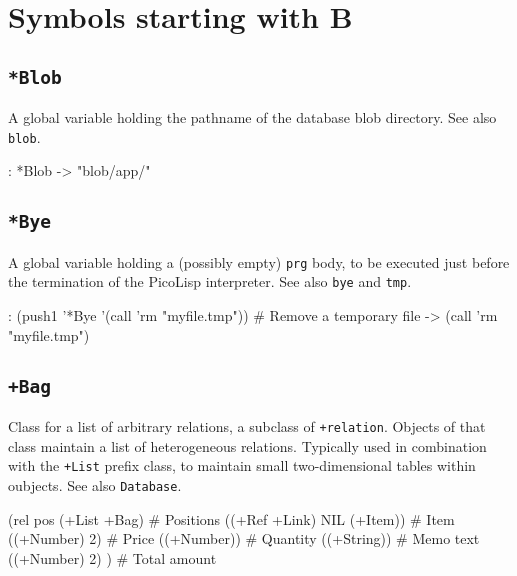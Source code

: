 %
%
%

\chapter{Symbols starting with B}
\label{cha:funct-ref-B-symbols-starting-B}
 
\section*{\texttt{*Blob}}
\label{sec:funct-ref-B-*blob}


A global variable holding the pathname of the database blob directory.
See also \texttt{blob}.


\begin{wideverbatim}
: *Blob
-> "blob/app/"
\end{wideverbatim}

 
\section*{\texttt{*Bye}}
\label{sec:funct-ref-B-*bye}


A global variable holding a (possibly empty) \texttt{prg} body, to be executed
just before the termination of the PicoLisp interpreter. See also \texttt{bye}
and \texttt{tmp}.


\begin{wideverbatim}
: (push1 '*Bye '(call 'rm "myfile.tmp"))  # Remove a temporary file
-> (call 'rm "myfile.tmp")
\end{wideverbatim}

 
\section*{\texttt{+Bag}}
\label{sec:funct-ref-B-+bag}


Class for a list of arbitrary relations, a subclass of \texttt{+relation}.
Objects of that class maintain a list of heterogeneous relations.
Typically used in combination with the \texttt{+List} prefix class, to maintain
small two-dimensional tables within oubjects. See also \texttt{Database}.


\begin{wideverbatim}
(rel pos (+List +Bag)         # Positions
   ((+Ref +Link) NIL (+Item))    # Item
   ((+Number) 2)                 # Price
   ((+Number))                   # Quantity
   ((+String))                   # Memo text
   ((+Number) 2) )               # Total amount
\end{wideverbatim}

